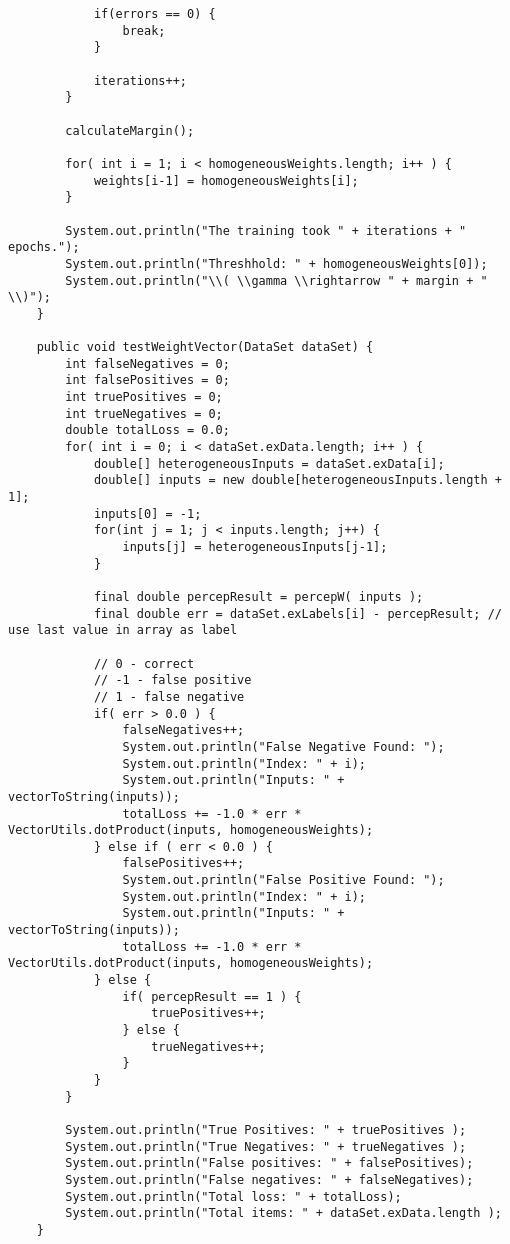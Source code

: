 \begin{lstlisting}
			if(errors == 0) {
				break;
			}
			
			iterations++;
		}
		
		calculateMargin();
		
		for( int i = 1; i < homogeneousWeights.length; i++ ) {
			weights[i-1] = homogeneousWeights[i];
		}
		
		System.out.println("The training took " + iterations + " epochs.");
		System.out.println("Threshhold: " + homogeneousWeights[0]);
		System.out.println("\\( \\gamma \\rightarrow " + margin + " \\)");
	}
	
	public void testWeightVector(DataSet dataSet) {
		int falseNegatives = 0;
		int falsePositives = 0;
		int truePositives = 0;
		int trueNegatives = 0;
		double totalLoss = 0.0;
		for( int i = 0; i < dataSet.exData.length; i++ ) {
			double[] heterogeneousInputs = dataSet.exData[i];
			double[] inputs = new double[heterogeneousInputs.length + 1];
			inputs[0] = -1;
			for(int j = 1; j < inputs.length; j++) {
				inputs[j] = heterogeneousInputs[j-1];
			}
			
			final double percepResult = percepW( inputs );
			final double err = dataSet.exLabels[i] - percepResult; // use last value in array as label
			
			// 0 - correct
			// -1 - false positive
			// 1 - false negative
			if( err > 0.0 ) {
				falseNegatives++;
				System.out.println("False Negative Found: ");
				System.out.println("Index: " + i);
				System.out.println("Inputs: " + vectorToString(inputs));
				totalLoss += -1.0 * err * VectorUtils.dotProduct(inputs, homogeneousWeights);
			} else if ( err < 0.0 ) {
				falsePositives++;
				System.out.println("False Positive Found: ");
				System.out.println("Index: " + i);
				System.out.println("Inputs: " + vectorToString(inputs));
				totalLoss += -1.0 * err * VectorUtils.dotProduct(inputs, homogeneousWeights);
			} else {
				if( percepResult == 1 ) {
					truePositives++;
				} else {
					trueNegatives++;
				}
			}
		}
		
		System.out.println("True Positives: " + truePositives );
		System.out.println("True Negatives: " + trueNegatives );
		System.out.println("False positives: " + falsePositives);
		System.out.println("False negatives: " + falseNegatives);
		System.out.println("Total loss: " + totalLoss);
		System.out.println("Total items: " + dataSet.exData.length );
	}
	

\end{lstlisting}
